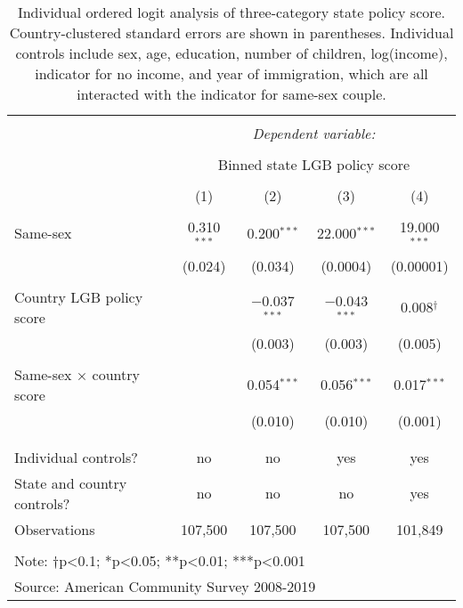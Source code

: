 \documentclass[
  11pt,
]{article}
\begin{document}
\begin{table}[!htbp] \centering 
  \caption{Individual ordered logit analysis of three-category state policy score. Country-clustered standard errors are shown in parentheses. Individual controls include sex, age, education, number of children, log(income), indicator for no income, and year of immigration, which are all interacted with the indicator for same-sex couple.} 
  \label{tab:ord} 
\begin{tabular}{@{\extracolsep{5pt}}lcccc} 
\\[-1.8ex]\hline 
\hline \\[-1.8ex] 
 & \multicolumn{4}{c}{\textit{Dependent variable:}} \\ 
\cline{2-5} 
\\[-1.8ex] & \multicolumn{4}{c}{Binned state LGB policy score} \\ 
\\[-1.8ex] & (1) & (2) & (3) & (4)\\ 
\hline \\[-1.8ex] 
 Same-sex & 0.310$^{***}$ & 0.200$^{***}$ & 22.000$^{***}$ & 19.000$^{***}$ \\ 
  & (0.024) & (0.034) & (0.0004) & (0.00001) \\ 
  & & & & \\ 
 Country LGB policy score &  & $-$0.037$^{***}$ & $-$0.043$^{***}$ & 0.008$^{†}$ \\ 
  &  & (0.003) & (0.003) & (0.005) \\ 
  & & & & \\ 
 Same-sex × country score &  & 0.054$^{***}$ & 0.056$^{***}$ & 0.017$^{***}$ \\ 
  &  & (0.010) & (0.010) & (0.001) \\ 
  & & & & \\ 
\hline \\[-1.8ex] 
Individual controls? & no & no & yes & yes \\ 
State and country controls? & no & no & no & yes \\ 
Observations & 107,500 & 107,500 & 107,500 & 101,849 \\ 
\hline 
\hline \\[-1.8ex] 
\multicolumn{5}{l}{Note: †p<0.1; *p<0.05; **p<0.01; ***p<0.001} \\ 
\multicolumn{5}{l}{Source: American Community Survey 2008-2019} \\ 
\end{tabular} 
\end{table}
\end{document}
